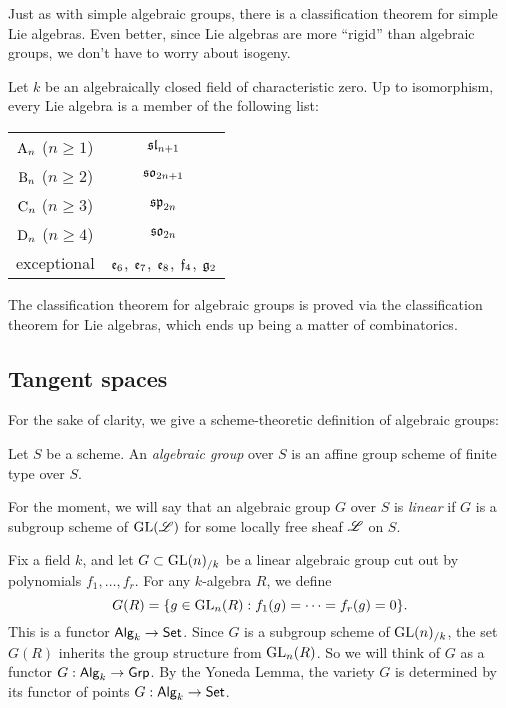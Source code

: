 Just as with simple algebraic groups, there is a classification theorem for 
simple Lie algebras. Even better, since Lie algebras are more ``rigid'' than 
algebraic groups, we don't have to worry about isogeny. 

\begin{theorem}
Let $k$ be an algebraically closed field of characteristic zero. Up to 
isomorphism, every Lie algebra is a member of the following list: 
\begin{center}
\begin{tabular}{c|c}
$\mathrm{A}_n$ ($n\geqslant 1$) & $\mathfrak{sl}_{n+1}$ \\
$\mathrm{B}_n$ ($n\geqslant 2$) & $\mathfrak{so}_{2n+1}$ \\
$\mathrm{C}_n$ ($n\geqslant 3$) & $\mathfrak{sp}_{2n}$ \\
$\mathrm{D}_n$ ($n\geqslant 4$)  & $\mathfrak{so}_{2n}$ \\
exceptional & $\mathfrak{e}_6$, $\mathfrak{e}_7$, $\mathfrak{e}_8$, $\mathfrak{f}_4$, $\mathfrak{g}_2$
\end{tabular}
\end{center}
\end{theorem}

The classification theorem for algebraic groups is proved via the 
classification theorem for Lie algebras, which ends up being a matter of 
combinatorics. 





\subsection{Tangent spaces}\label{sec:tangent-space}

For the sake of clarity, we give a scheme-theoretic definition of algebraic 
groups:

\begin{definition}
Let $S$ be a scheme. An \emph{algebraic group} over $S$ is an affine group 
scheme of finite type over $S$. 
\end{definition}

For the moment, we will say that an algebraic group $G$ over $S$ is 
\emph{linear} if $G$ is a subgroup scheme of $\operatorname{GL}(\mathscr{L})$ for some locally 
free sheaf $\mathscr{L}$ on $S$. 

Fix a field $k$, and let $G\subset \operatorname{GL}(n)_{/k}$ be a linear algebraic group cut 
out by polynomials $f_1,\dots,f_r$. For any $k$-algebra $R$, we define
\[
  G(R) = \{g\in \operatorname{GL}_n(R):f_1(g)=\cdots = f_r(g)=0\} .
\]
This is a functor $\mathsf{Alg}_{k}\to \mathsf{Set}$. Since $G$ is a subgroup scheme of 
$\operatorname{GL}(n)_{/k}$, the set $G(R)$ inherits the group structure from $\operatorname{GL}_n(R)$. 
So we will think of $G$ as a functor $G:\mathsf{Alg}_{k} \to \mathsf{Grp}$. By the Yoneda 
Lemma, the variety $G$ is determined by its functor of points 
$G:\mathsf{Alg}_{k}\to \mathsf{Set}$. 

